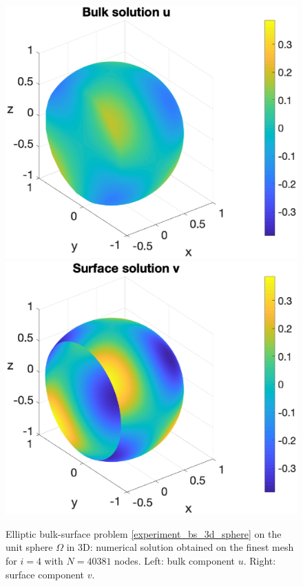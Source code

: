 \documentclass[a4paper]{article}
\begin{document}
\begin{figure}[H]
\begin{center}
\hspace*{-10mm}
\includegraphics[scale=0.4]{bs_3d_sphere_nx41_u.eps}
\hspace*{-5mm}
\includegraphics[scale=0.4]{bs_3d_sphere_nx41_v.eps}
\end{center}
\caption{Elliptic bulk-surface  problem \eqref{experiment_bs_3d_sphere} on the unit sphere $\Omega$ in 3D: numerical solution obtained on the finest mesh for $i=4$ with $N= 40381$ nodes. Left: bulk component $u$. Right: surface component $v$.}
\label{fig:bs_3d_numsol_sphere}
\end{figure} 
\end{document}
